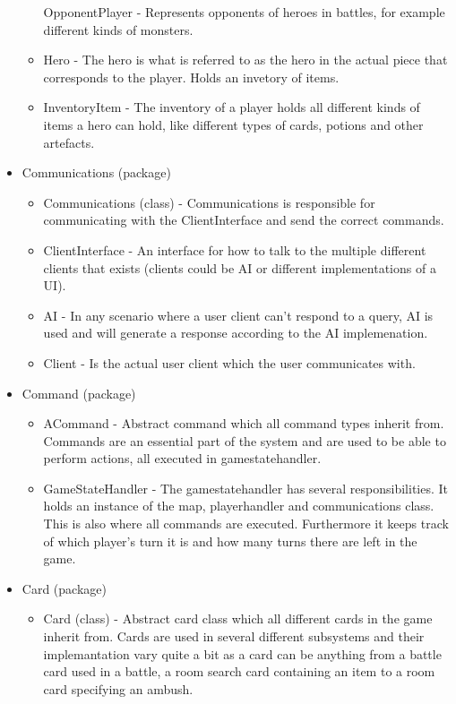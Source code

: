 \begin{itemize}
\begin{itemize}
	OpponentPlayer - Represents opponents of heroes in battles, for example different kinds of monsters.
	\item
	Hero - The hero is what is referred to as the hero in the actual piece that corresponds to the player. Holds an invetory of items.
	\item
	InventoryItem - The inventory of a player holds all different kinds of items a hero can hold, like different types of cards, potions and other artefacts.
	\end{itemize}
\item
Communications (package)
	\begin{itemize}
	\item
	Communications (class) - Communications is responsible for communicating with the ClientInterface and send the correct commands.  
	\item
	ClientInterface - An interface for how to talk to the multiple different clients that exists (clients could be AI or different implementations of a UI).
	\item
	AI - In any scenario where a user client can't respond to a query, AI is used and will generate a response according to the AI implemenation.
	\item
	Client - Is the actual user client which the user communicates with.
	\end{itemize}
\item
Command (package)
	\begin{itemize}
	\item
	ACommand - Abstract command which all command types inherit from. Commands are an essential part of the system and are used to be able to perform actions, all executed in gamestatehandler.   
	\item
	GameStateHandler - The gamestatehandler has several responsibilities. It holds an instance of the map, playerhandler and communications class. This is also where all commands are executed. Furthermore it keeps track of which player's turn it is and how many turns there are left in the game. 
	\end{itemize}
\item
Card (package)
	\begin{itemize}
	\item
	Card (class) - Abstract card class which all different cards in the game inherit from. Cards are used in several different subsystems and their implemantation vary quite a bit as a card can be anything from a battle card used in a battle, a room search card containing an item to a room card specifying an ambush.   
	\end{itemize}
\end{itemize}
